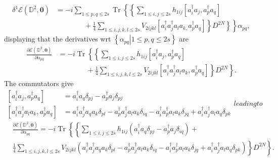 \documentclass[aps,preprint]{revtex4}%
\begin{document}
\begin{align}
\delta^{1}\mathcal{E}\left(  \mathbb{D}^{2},\mathbf{0}\right)   &
=-i\sum_{1\leq p,q\leq2s}\operatorname{Tr}\left\{  \left\{  \sum_{1\leq
i,j\leq2s}h_{1ij}\left[  a_{i}^{\dagger}a_{j},a_{p}^{\dagger}a_{q}\right]
\right.  \right.  \nonumber\\
&  \qquad\qquad+\left.  \left.  \frac{1}{4}\sum_{1\leq i,j,k,l\leq2s}%
V_{2ijkl}\left[  a_{i}^{\dagger}a_{j}^{\dagger}a_{l}a_{k,}a_{p}^{\dagger}%
a_{q}\right]  \right\}  \left.  D^{2N}\right\}  \right\}  \alpha_{pq},
\end{align}
displaying that the derivatives wrt $\left\{  \left.  \alpha_{pq}\right\vert
1\leq p,q\leq2s\right\}  $ are
\begin{align}
\frac{\partial\mathcal{E}\left(  \mathbb{D}^{2},\mathbf{0}\right)  }%
{\partial\alpha_{pq}} &  =-i\operatorname{Tr}\left\{  \left\{  \sum_{1\leq
i,j\leq2s}h_{1ij}\left[  a_{i}^{\dagger}a_{j},a_{p}^{\dagger}a_{q}\right]
\right.  \right.  \nonumber\\
&  \qquad\qquad+\left.  \left.  \frac{1}{4}\sum_{1\leq i,j,k,l\leq2s}%
V_{2ijkl}\left[  a_{i}^{\dagger}a_{j}^{\dagger}a_{l}a_{k},a_{p}^{\dagger}%
a_{q}\right]  \right\}  D^{2N}\right\}  .
\end{align}
The commutators give
\begin{subequations}
\begin{align}
\left[  a_{i}^{\dagger}a_{j},a_{p}^{\dagger}a_{q}\right]   &  =a_{i}^{\dagger
}a_{q}\delta_{pj}-a_{p}^{\dagger}a_{j}\delta_{pj}\\
\left[  a_{i}^{\dagger}a_{j}^{\dagger}a_{l}a_{k},a_{p}^{\dagger}a_{q}\right]
&  =a_{i}^{\dagger}a_{j}^{\dagger}a_{q}a_{k}\delta_{pl}-a_{p}^{\dagger}%
a_{j}^{\dagger}a_{l}a_{k}\delta_{iq}-a_{i}^{\dagger}a_{p}^{\dagger}a_{l}%
a_{k}\delta_{jq}+a_{i}^{\dagger}a_{j}^{\dagger}a_{l}a_{q}\delta_{pk}%
\end{align}
leading to
\end{subequations}
\begin{align}
&  \frac{\partial\mathcal{E}\left(  \mathbb{D}^{2},\mathbf{0}\right)
}{\partial\alpha_{pq}}=-i\operatorname{Tr}\left\{  \left\{  \sum_{1\leq
i,j\leq2s}h_{1ij}\left(  a_{i}^{\dagger}a_{q}\delta_{pj}-a_{p}^{\dagger}%
a_{j}\delta_{iq}\right)  \right.  \right.  +\nonumber\\
&  \left.  \left.  \frac{1}{4}\sum_{1\leq i,j,k,l\leq2s}V_{2ijkl}\left(
a_{i}^{\dagger}a_{j}^{\dagger}a_{q}a_{k}\delta_{pl}-a_{p}^{\dagger}%
a_{j}^{\dagger}a_{l}a_{k}\delta_{iq}-a_{i}^{\dagger}a_{p}^{\dagger}a_{l}%
a_{k}\delta_{jq}+a_{i}^{\dagger}a_{j}^{\dagger}a_{l}a_{q}\delta_{pk}\right)
\right\}  D^{2N}\right\}  .
\end{align}
\end{document}
